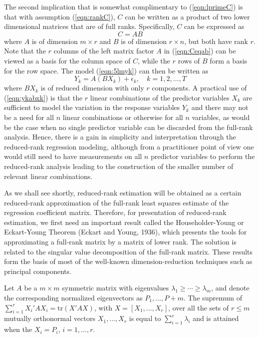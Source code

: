 The second implication that is somewhat complimentary to (\ref{eqn:lprimeC}) is that with assumption (\ref{eqn:rankC}), $C$ can be written as a product of two lower dimensional matrices that are of full ranks. Specifically, $C$ can be expressed as
	\begin{equation}\label{eqn:Ceqab}
	C=AB
	\end{equation}
where $A$ is of dimension $m \times r$ and $B$ is of dimension $r \times n$, but both have rank $r$. Note that the $r$ columns of the left matrix factor $A$ in (\ref{eqn:Ceqab}) can be viewed as a basis for the column space of $C$, while the $r$ rows of $B$ form a basis for the row space. The model (\ref{eqn:5lmyk}) can then be written as
	\begin{equation}\label{eqn:ykabxk}
	Y_k=A(BX_k)+\epsilon_k, \quad k=1,2,\ldots,T
	\end{equation}
where $BX_k$ is of reduced dimension with only $r$ components. A practical use of (\ref{eqn:ykabxk}) is that the $r$ linear combinations of the predictor variables $X_k$ are sufficient to model the variation in the response variables $Y_k$ and there may not be a need for all $n$ linear combinations or otherwise for all $n$ variables, as would be the case when no single predictor variable can be discarded from the full-rank analysis. Hence, there is a gain in simplicity and interpretation through the reduced-rank regression modeling, although from a practitioner point of view one would still need to have measurements on all $n$ predictor variables to perform the reduced-rank analysis leading to the construction of the smaller number of relevant linear combinations. 


As we shall see shortly, reduced-rank estimation will be obtained as a certain reduced-rank approximation of the full-rank least squares estimate of the regression coefficient matrix. Therefore, for presentation of reduced-rank estimation, we first need an important result called the Householder-Young or Eckart-Young Theorem (Eckart and Young, 1936), which presents the tools for approximating a full-rank matrix by a matrix of lower rank. The solution is related to the singular value decomposition of the full-rank matrix. These results form the basis of most of the well-known dimension-reduction techniques such as principal components. \\


\begin{result}\label{res:2}
Let $A$ be a $m \times m$ symmetric matrix with eigenvalues $\lambda_1 \geq \cdots \geq \lambda_m$, and denote the corresponding normalized eigenvectors as $P_1,\ldots,P+m$. The supremum of $\sum_{i=1}^r X_i'AX_i=\text{tr}(X'AX)$, with $X=[X_1,\ldots,X_r]$, over all the sets of $r \leq m$ mutually orthonormal vectors $X_1,\ldots,X_r$ is equal to $\sum_{i=1}^r \lambda_i$ and is attained when the $X_i=P_i$, $i=1,\ldots,r$. 
\end{result}



